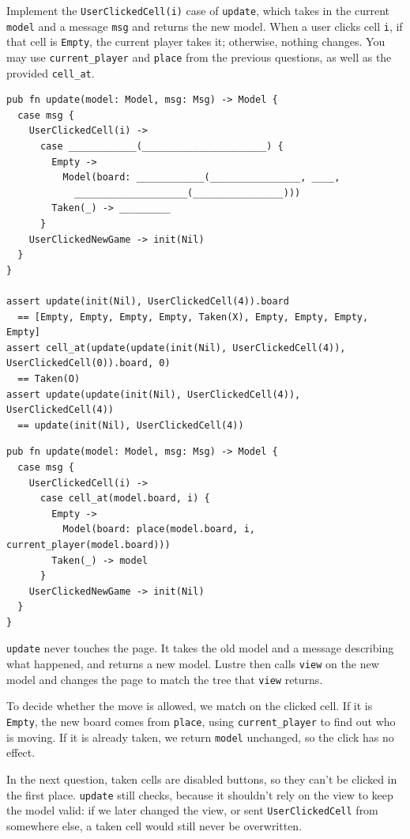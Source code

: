 \begin{blocksection}
\question Implement the \lstinline{UserClickedCell(i)} case of \texttt{update}, which takes in the current \texttt{model} and a message \texttt{msg} and returns the new model. When a user clicks cell \texttt{i}, if that cell is \lstinline{Empty}, the current player takes it; otherwise, nothing changes. You may use \texttt{current\_player} and \texttt{place} from the previous questions, as well as the provided \texttt{cell\_at}.
\begin{lstlisting}
pub fn update(model: Model, msg: Msg) -> Model {
  case msg {
    UserClickedCell(i) ->
      case ____________(______________________) {
        Empty ->
          Model(board: ____________(________________, ____,
            ____________________(________________)))
        Taken(_) -> _________
      }
    UserClickedNewGame -> init(Nil)
  }
}

assert update(init(Nil), UserClickedCell(4)).board
  == [Empty, Empty, Empty, Empty, Taken(X), Empty, Empty, Empty, Empty]
assert cell_at(update(update(init(Nil), UserClickedCell(4)), UserClickedCell(0)).board, 0)
  == Taken(O)
assert update(update(init(Nil), UserClickedCell(4)), UserClickedCell(4))
  == update(init(Nil), UserClickedCell(4))
\end{lstlisting}

\begin{solution}
\begin{lstlisting}
pub fn update(model: Model, msg: Msg) -> Model {
  case msg {
    UserClickedCell(i) ->
      case cell_at(model.board, i) {
        Empty ->
          Model(board: place(model.board, i, current_player(model.board)))
        Taken(_) -> model
      }
    UserClickedNewGame -> init(Nil)
  }
}
\end{lstlisting}
\end{solution}

\begin{questionmeta}
  \texttt{update} never touches the page. It takes the old model and a message describing what happened, and returns a new model. Lustre then calls \texttt{view} on the new model and changes the page to match the tree that \texttt{view} returns.

  To decide whether the move is allowed, we match on the clicked cell. If it is \lstinline{Empty}, the new board comes from \texttt{place}, using \texttt{current\_player} to find out who is moving. If it is already taken, we return \texttt{model} unchanged, so the click has no effect.

  In the next question, taken cells are disabled buttons, so they can't be clicked in the first place. \texttt{update} still checks, because it shouldn't rely on the view to keep the model valid: if we later changed the view, or sent \lstinline{UserClickedCell} from somewhere else, a taken cell would still never be overwritten.
\end{questionmeta}
\end{blocksection}
